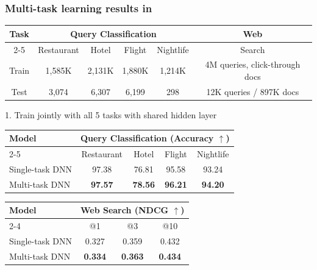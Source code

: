 \begin{frame}[plain]
\frametitle{Multi-task learning results in \cite{liu15multitask}}

\begin{table}
\centering
\tabcolsep=0.08cm
\begin{tabular}{|c | c | c | c | c || c | }
\hline
\multirow{2}{*}{Task}		&\multicolumn{4}{|c||}{Query Classification} & Web \\ \cline{2-5}
\multicolumn{1}{ |c| }{} 	&Restaurant	& Hotel  	&Flight		&Nightlife	  &Search\\ \hline \hline
Train							&1,585K		&2,131K	&1,880K	&1,214K	  &4M queries, click-through docs \\ \hline
Test									&3,074			&6,307		&6,199		&298		  &12K queries / 897K docs \\ \hline
\end{tabular}
\end{table}

1. Train jointly with all 5 tasks with shared hidden layer
\begin{table}[ht!]
\centering
\tabcolsep=0.09cm
\begin{tabular}{ l | c | c | c | c }
\hline
\multirow{2}{*}{Model}	&\multicolumn{4}{|c}{Query Classification (Accuracy $\uparrow$)} \\ \cline{2-5}
\multicolumn{1}{ c | }{} 	&Restaurant	& Hotel  	&Flight		&Nightlife	 \\ \hline \hline
Single-task DNN									&97.38			&76.81		&95.58		&93.24		 \\ \hline
Multi-task DNN							&\textbf{97.57}			&\textbf{78.56}		&\textbf{96.21}		&\textbf{94.20}		 \\ \hline
\end{tabular}
\end{table}

\begin{table}[ht!]
\centering
\tabcolsep=0.08cm
\begin{tabular}{l || c | c | c }
\hline
\multirow{2}{*}{Model}					&\multicolumn{3}{|c}{Web Search (NDCG $\uparrow$)} \\ \cline{2-4} 
																				&@1 				&@3 				&@10\\ \hline \hline
Single-task DNN	&0.327				&0.359				&0.432			\\ \hline
Multi-task DNN &\textbf{0.334}				&\textbf{0.363}				&\textbf{0.434} 		\\ \hline
\end{tabular}
\end{table}
\end{frame}


